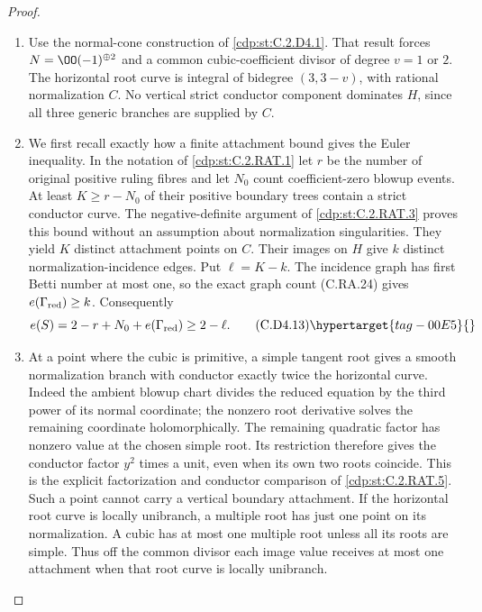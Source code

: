 \begin{proof}

\begin{enumerate}[label={$\langle1\rangle$\arabic*.},leftmargin=*]
\item Use the normal-cone construction of \ref{cdp:st:C.2.D4.1}. That result forces
$N=\OO(-1)^{\oplus2}$ and a common cubic-coefficient divisor
of degree $v=1$ or $2$. The horizontal root curve is integral
of bidegree $(3,3-v)$, with rational normalization $C$.
No vertical strict conductor component dominates $H$, since
all three generic branches are supplied by $C$.

\item We first recall exactly how a finite attachment bound gives
the Euler inequality. In the notation of \ref{cdp:st:C.2.RAT.1} let $r$
be the number of original positive ruling fibres and let
$N_0$ count coefficient-zero blowup events. At least
$K\ge r-N_0$ of their positive boundary trees contain a
strict conductor curve. The negative-definite argument of
\ref{cdp:st:C.2.RAT.3} proves this bound without an assumption about
normalization singularities. They yield $K$ distinct
attachment points on $C$. Their images on $H$ give $k$
distinct normalization-incidence edges. Put $\ell=K-k$.
The incidence graph has first Betti number at most one,
so the exact graph count (C.RA.24) gives
$e(\Gamma_{\rm red})\ge k$. Consequently
\[
             e(S)=2-r+N_0+e(\Gamma_{\rm red})\ge2-\ell.
\tag{C.D4.13}\hypertarget{tag-00E5}{}\label{cdp:eq:C.D4.13}
\]

\item At a point where the cubic is primitive, a simple tangent
root gives a smooth normalization branch with conductor
exactly twice the horizontal curve. Indeed the ambient
blowup chart divides the reduced equation by the third
power of its normal coordinate; the nonzero root derivative
solves the remaining coordinate holomorphically. The
remaining quadratic factor has nonzero value at the chosen
simple root. Its restriction therefore gives the conductor
factor $y^2$ times a unit, even when its own two roots coincide. This is the explicit
factorization and conductor comparison of \ref{cdp:st:C.2.RAT.5}.
Such a point cannot carry a vertical boundary attachment.
If the horizontal root curve is locally unibranch, a
multiple root has just one point on its normalization.
A cubic has at most one multiple root unless all its roots
are simple. Thus off the common divisor each image value
receives at most one attachment when that root curve is
locally unibranch.


\end{enumerate}
\end{proof}
